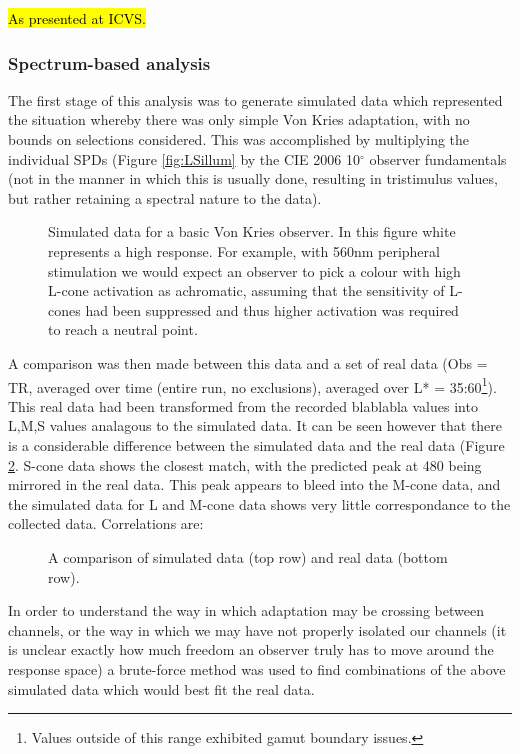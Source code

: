 \hl{As presented at ICVS.}

\subsubsection{Spectrum-based analysis}

The first stage of this analysis was to generate simulated data which represented the situation whereby there was only simple Von Kries adaptation, with no bounds on selections considered. This was accomplished by multiplying the individual \glspl{SPD} (Figure \ref{fig:LSillum} by the CIE 2006 10$^{\circ}$ observer fundamentals (not in the manner in which this is usually done, resulting in tristimulus values, but rather retaining a spectral nature to the data).

\begin{figure}[htbp]
\caption{Simulated data for a basic Von Kries observer. In this figure white represents a high response. For example, with 560nm peripheral stimulation we would expect an observer to pick a colour with high L-cone activation as achromatic, assuming that the sensitivity of L-cones had been suppressed and thus higher activation was required to reach a neutral point.}
\label{fig:LSsimdata}
\end{figure}

A comparison was then made between this data and a set of real data (Obs = TR, averaged over time (entire run, no exclusions), averaged over L* = 35:60\footnote{Values outside of this range exhibited gamut boundary issues.}). This real data had been transformed from the recorded blablabla %
values into L,M,S values analagous to the simulated data. It can be seen however that there is a considerable difference between the simulated data and the real data (Figure \ref{fig:simVreal}. S-cone data shows the closest match, with the predicted peak at 480 being mirrored in the real data. This peak appears to bleed into the M-cone data, and the simulated data for L and M-cone data shows very little correspondance to the collected data. Correlations are:

\begin{figure}[htbp]
\caption{A comparison of simulated data (top row) and real data (bottom row).}
\label{fig:simVreal}
\end{figure}

In order to understand the way in which adaptation may be crossing between channels, or the way in which we may have not properly isolated our channels (it is unclear exactly how much freedom an observer truly has to move around the response space) a brute-force method was used to find combinations of the above simulated data which would best fit the real data.

